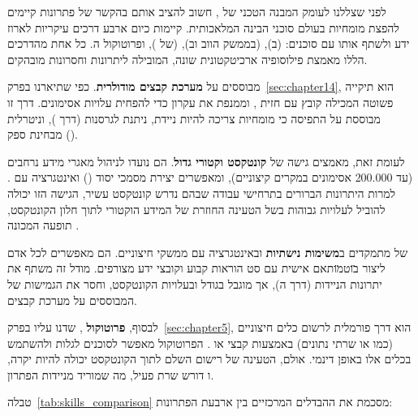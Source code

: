 \label{sec:chapter15}


לפני שצללנו לעומק המבנה הטכני של , חשוב להציב אותם בהקשר של פתרונות קיימים להפצת מומחיות בעולם סוכני הבינה המלאכותית. קיימות כיום ארבע דרכים עיקריות לארוז ידע ולשתף אותו עם סוכנים:  (ב),  (בממשק הווב וב),  (של ), ופרוטוקול ה. כל אחת מהדרכים הללו מאמצת פילוסופיה ארכיטקטונית שונה, המובילה ליתרונות וחסרונות מובהקים.

 מבוססים על \textbf{מערכת קבצים מודולרית}. כפי שתיארנו בפרק~\ref{sec:chapter14},  הוא תיקייה פשוטה המכילה קובץ  עם חזית , וממנפת את עקרון  כדי להפחית עלויות אסימונים. דרך זו מבוססת על התפיסה כי מומחיות צריכה להיות ניידת, ניתנת לגרסנות (דרך ), וניטרלית מבחינת ספק ().

לעומת זאת, \cite{anthropic2025projects} מאמצים גישה של \textbf{קונטקסט וקטורי גדול}. הם נועדו לניהול מאגרי מידע נרחבים (עד \num{200,000} אסימונים במקרים קיצוניים), ומאפשרים יצירת מסמכי יסוד () ואינטגרציה עם . למרות היתרונות הברורים בתרחישי עבודה שבהם נדרש קונטקסט עשיר, הגישה הזו יכולה להוביל לעלויות גבוהות בשל הטעינה החוזרת של המידע הוקטורי לתוך חלון הקונטקסט, תופעה המכונה \cite{anthropic2025thrashing}.

 של  מתמקדים ב\textbf{משימות נישתיות} ובאינטגרציה עם ממשקי  חיצוניים. הם מאפשרים לכל אדם ליצור \"בוט\" מותאם אישית עם סט הוראות קבוע וקובצי ידע מצורפים. מודל זה משתף את יתרונות הניידות (דרך ה), אך מוגבל בגודל ובעלויות הקונטקסט, וחסר את הגמישות של  המבוססים על מערכת קבצים.

לבסוף, \textbf{פרוטוקול }\cite{anthropic2024mcp}, שדנו עליו בפרק~\ref{sec:chapter5}, הוא דרך פורמלית לרשום כלים חיצוניים (כמו  או שרתי נתונים) באמצעות קבצי  או . הפרוטוקול מאפשר לסוכנים לגלות ולהשתמש בכלים אלו באופן דינמי. אולם, הטעינה של רישום  השלם לתוך הקונטקסט יכולה להיות יקרה, ו דורש שרת פעיל, מה שמוריד מניידות הפתרון.

טבלה~\ref{tab:skills_comparison} מסכמת את ההבדלים המרכזיים בין ארבעת הפתרונות:

